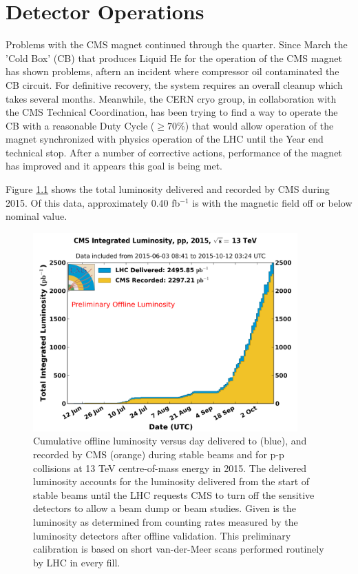 \chapter{Detector Operations}

Problems with the CMS magnet continued through the quarter.  Since March the 
'Cold Box' (CB) that produces	 Liquid He	for the operation of the CMS magnet	has	shown problems, aftern an incident where compressor oil contaminated the CB circuit. For definitive	recovery, the system	requires an	
overall cleanup	which takes several months. Meanwhile, the CERN cryo group,	in collaboration	
with the CMS Technical Coordination, has	been	
trying to find a way to operate the CB with	a reasonable Duty Cycle ($\ge 70\%$)	that	would	allow	
operation	of	the	magnet	synchronized	with	
physics	operation	of	the	LHC	until	the	Year	end	
technical	stop.  After a number of corrective actions, performance of the magnet has improved and it appears this goal is being met. 
 
Figure \ref{fig:lumi} shows the total luminosity delivered and recorded by CMS during 2015.  Of this data, approximately 0.40 fb$^{-1}$ is with the magnetic field off or below  nominal value.
\begin {figure}[h]
\begin{center}
\includegraphics  [width=4in] {figures/int_lumi_per_day_cumulative_pp_2015.png}
\caption{Cumulative offline luminosity versus day delivered to (blue), and recorded by CMS (orange) during stable beams and for p-p collisions at 13 TeV centre-of-mass energy in 2015. The delivered luminosity accounts for the luminosity delivered from the start of stable beams until the LHC requests CMS to turn off the sensitive detectors to allow a beam dump or beam studies. Given is the luminosity as determined from counting rates measured by the luminosity detectors after offline validation. This preliminary calibration is based on short van-der-Meer scans performed routinely by LHC in every fill.}
\label{fig:lumi}
\end{center}
\end{figure}

